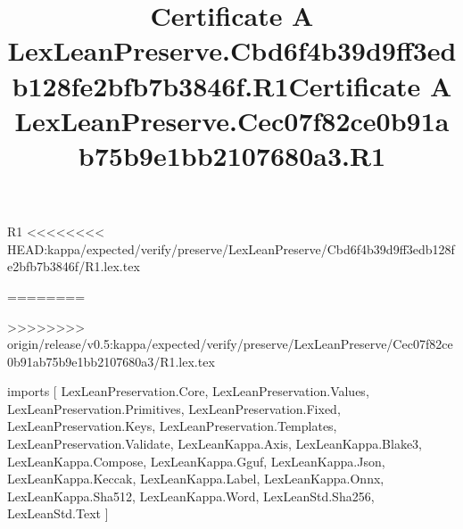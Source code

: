 \begin{lexlean}{R1}
<<<<<<<< HEAD:kappa/expected/verify/preserve/LexLeanPreserve/Cbd6f4b39d9ff3edb128fe2bfb7b3846f/R1.lex.tex
\title{Certificate A LexLeanPreserve.Cbd6f4b39d9ff3edb128fe2bfb7b3846f.R1}
========
\title{Certificate A LexLeanPreserve.Cec07f82ce0b91ab75b9e1bb2107680a3.R1}
>>>>>>>> origin/release/v0.5:kappa/expected/verify/preserve/LexLeanPreserve/Cec07f82ce0b91ab75b9e1bb2107680a3/R1.lex.tex
\begin{coremodule}
imports [
  LexLeanPreservation.Core,
  LexLeanPreservation.Values,
  LexLeanPreservation.Primitives,
  LexLeanPreservation.Fixed,
  LexLeanPreservation.Keys,
  LexLeanPreservation.Templates,
  LexLeanPreservation.Validate,
  LexLeanKappa.Axis,
  LexLeanKappa.Blake3,
  LexLeanKappa.Compose,
  LexLeanKappa.Gguf,
  LexLeanKappa.Json,
  LexLeanKappa.Keccak,
  LexLeanKappa.Label,
  LexLeanKappa.Onnx,
  LexLeanKappa.Sha512,
  LexLeanKappa.Word,
  LexLeanStd.Sha256,
  LexLeanStd.Text
]


\end{coremodule}
\end{lexlean}
